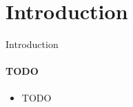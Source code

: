 \section{Introduction}

\begin{frame}{Introduction}
  \framesubtitle{TODO}
  \begin{itemize}
      \item TODO
  \end{itemize}
\end{frame}

